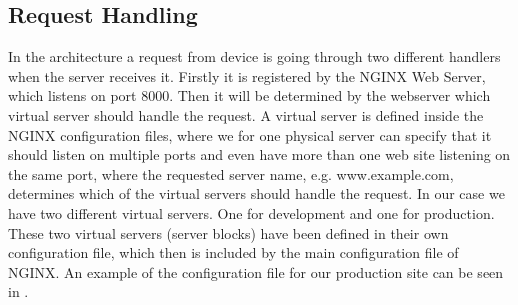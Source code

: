 \subsection{Request Handling}
\label{sub:request_handling}
In the architecture a request from device is going through two different handlers when the server receives it. Firstly it is registered by the NGINX Web Server, which listens on port 8000. Then it will be determined by the webserver which virtual server should handle the request. A virtual server is defined inside the NGINX configuration files, where we for one physical server can specify that it should listen on multiple ports and even have more than one web site listening on the same port, where the requested server name, e.g. www.example.com, determines which of the virtual servers should handle the request. In our case we have two different virtual servers. One for development and one for production. These two virtual servers (server blocks) have been defined in their own configuration file, which then is included by the main configuration file of NGINX. An example of the configuration file for our production site can be seen in . 




